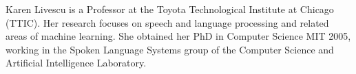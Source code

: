 Karen Livescu is a Professor at the Toyota Technological Institute at Chicago (TTIC). Her research focuses on speech and language processing and related areas of machine learning. She obtained her PhD in Computer Science MIT 2005, working in the Spoken Language Systems group of the Computer Science and Artificial Intelligence Laboratory. 
